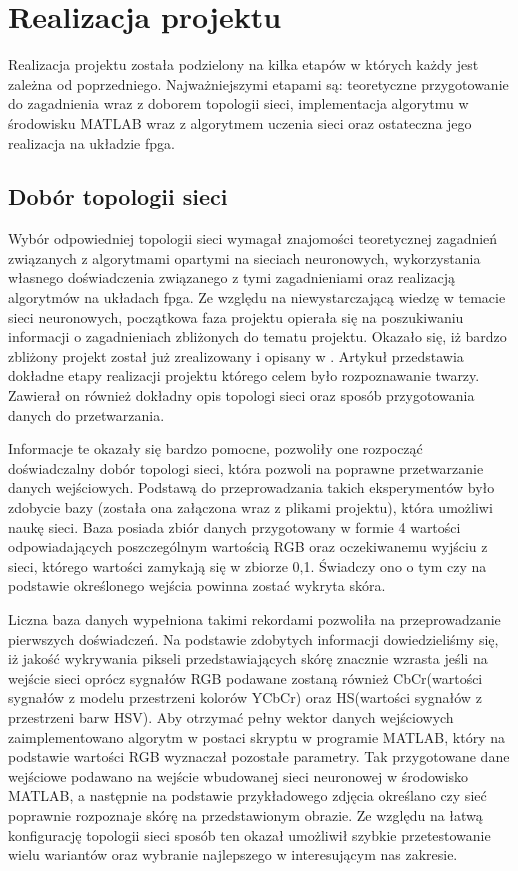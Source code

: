 \chapter{Realizacja projektu}
\label{cha:realizacja}

Realizacja projektu została podzielony na kilka etapów w których każdy jest zależna od  poprzedniego. Najważniejszymi etapami są: teoretyczne przygotowanie do zagadnienia wraz z doborem topologii sieci, implementacja algorytmu w środowisku MATLAB wraz z algorytmem uczenia sieci oraz ostateczna jego realizacja na układzie fpga. 
\section{Dobór topologii sieci}

Wybór odpowiedniej topologii sieci wymagał znajomości teoretycznej zagadnień związanych z algorytmami opartymi na sieciach neuronowych, wykorzystania własnego doświadczenia związanego z tymi zagadnieniami oraz realizacją algorytmów na układach fpga. Ze względu na niewystarczającą wiedzę w temacie sieci neuronowych, początkowa faza projektu opierała się na poszukiwaniu informacji o zagadnieniach zbliżonych do tematu projektu. Okazało się, iż bardzo zbliżony projekt został już zrealizowany i opisany w \cite{fdciuss}. Artykuł przedstawia dokładne etapy realizacji projektu którego celem było rozpoznawanie twarzy. Zawierał on również dokładny opis topologi sieci oraz sposób przygotowania danych do przetwarzania. 

Informacje te okazały się bardzo pomocne, pozwoliły one rozpocząć doświadczalny dobór topologi sieci, która pozwoli na poprawne przetwarzanie danych wejściowych. 
Podstawą do przeprowadzania takich eksperymentów było zdobycie bazy (została ona załączona wraz z plikami projektu), która umożliwi naukę sieci. Baza posiada zbiór danych przygotowany w formie 4 wartości odpowiadających poszczególnym wartością RGB oraz oczekiwanemu wyjściu z sieci, którego wartości zamykają się w zbiorze {0,1}. Świadczy ono o tym czy na podstawie określonego wejścia powinna zostać wykryta skóra.

Liczna baza danych wypełniona takimi rekordami pozwoliła na przeprowadzanie pierwszych doświadczeń. Na podstawie zdobytych informacji dowiedzieliśmy się, iż jakość wykrywania pikseli przedstawiających skórę znacznie wzrasta jeśli na wejście sieci oprócz sygnałów RGB podawane zostaną również CbCr(wartości sygnałów z modelu przestrzeni kolorów YCbCr) oraz HS(wartości sygnałów z przestrzeni barw HSV). Aby otrzymać pełny wektor danych wejściowych zaimplementowano algorytm w postaci skryptu w programie MATLAB, który na podstawie wartości RGB wyznaczał pozostałe parametry. Tak przygotowane dane wejściowe podawano na wejście wbudowanej sieci neuronowej w środowisko MATLAB, a następnie na podstawie przykładowego zdjęcia określano czy sieć poprawnie rozpoznaje skórę na przedstawionym obrazie. Ze względu na łatwą konfigurację topologii sieci sposób ten okazał umożliwił szybkie przetestowanie wielu wariantów oraz wybranie najlepszego w interesującym nas zakresie.

